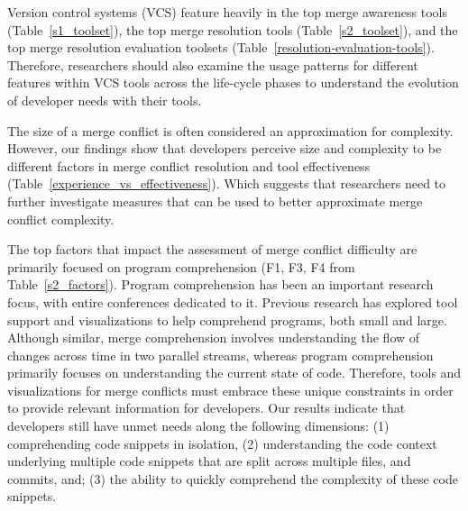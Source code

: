 Version control systems (VCS) feature heavily in the top merge awareness tools (Table~\ref{s1_toolset}), the top merge resolution tools (Table~\ref{s2_toolset}), and the top merge resolution evaluation toolsets (Table~\ref{resolution-evaluation-tools}).
Therefore, researchers should also examine the usage patterns for different features within VCS tools across the life-cycle phases to understand the evolution of developer needs with their tools.

The size of a merge conflict is often considered an approximation for complexity.
However, our findings show that developers perceive size and complexity to be different factors in merge conflict resolution and tool effectiveness (Table~\ref{experience_vs_effectiveness}).
Which suggests that researchers need to further investigate measures that can be used to better approximate merge conflict complexity.

The top factors that impact the assessment of merge conflict difficulty are primarily focused on program comprehension (F1, F3, F4 from Table~\ref{s2_factors}).
Program comprehension has been an important research focus, with entire conferences dedicated to it.
Previous research has explored tool support and visualizations to help comprehend programs, both small and large.
Although similar, merge comprehension involves understanding the flow of changes across time in two parallel streams, whereas program comprehension primarily focuses on understanding the current state of code.
Therefore, tools and visualizations for merge conflicts must embrace these unique constraints in order to provide relevant information for developers.
Our results indicate that developers still have unmet needs along the following dimensions: (1) comprehending code snippets in isolation, (2) understanding the code context underlying multiple code snippets that are split across multiple files, and commits, and; (3) the ability to quickly comprehend the complexity of these code snippets. 


